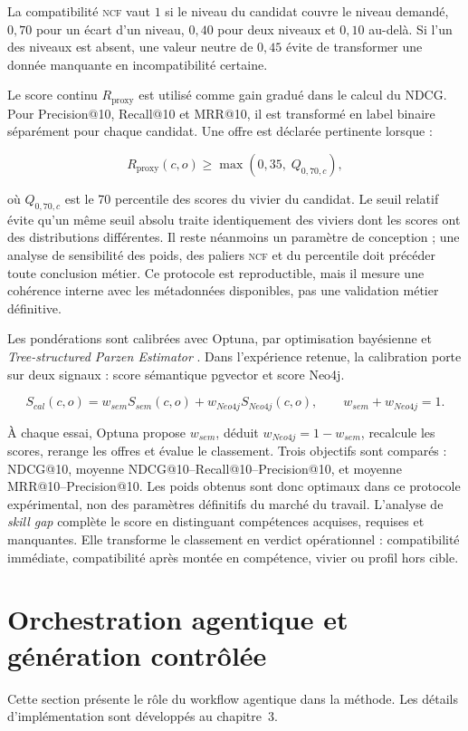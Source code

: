 \documentclass[12pt,twoside]{report}
\newcommand{\NCF}{\textsc{ncf}}
\begin{document}
La compatibilité \NCF{} vaut $1$ si le niveau du candidat couvre le niveau demandé, $0{,}70$ pour un écart d'un niveau, $0{,}40$ pour deux niveaux et $0{,}10$ au-delà. Si l'un des niveaux est absent, une valeur neutre de $0{,}45$ évite de transformer une donnée manquante en incompatibilité certaine.

Le score continu $R_{\mathrm{proxy}}$ est utilisé comme gain gradué dans le calcul du NDCG. Pour Precision@10, Recall@10 et MRR@10, il est transformé en label binaire séparément pour chaque candidat. Une offre est déclarée pertinente lorsque :

\[
R_{\mathrm{proxy}}(c,o)\geq
\max\!\left(0{,}35,\;Q_{0{,}70,c}\right),
\]

\noindent où $Q_{0{,}70,c}$ est le 70\ieme{} percentile des scores du vivier du candidat. Le seuil relatif évite qu'un même seuil absolu traite identiquement des viviers dont les scores ont des distributions différentes. Il reste néanmoins un paramètre de conception ; une analyse de sensibilité des poids, des paliers \NCF{} et du percentile doit précéder toute conclusion métier. Ce protocole est reproductible, mais il mesure une cohérence interne avec les métadonnées disponibles, pas une validation métier définitive.

Les pondérations sont calibrées avec Optuna, par optimisation bayésienne et \textit{Tree-structured Parzen Estimator} \cite{akiba2019optuna}. Dans l'expérience retenue, la calibration porte sur deux signaux : score sémantique pgvector et score Neo4j.

\[
S_{cal}(c,o)=w_{sem}S_{sem}(c,o)+w_{Neo4j}S_{Neo4j}(c,o),
\qquad w_{sem}+w_{Neo4j}=1.
\]

À chaque essai, Optuna propose $w_{sem}$, déduit $w_{Neo4j}=1-w_{sem}$, recalcule les scores, rerange les offres et évalue le classement. Trois objectifs sont comparés : NDCG@10, moyenne NDCG@10--Recall@10--Precision@10, et moyenne MRR@10--Precision@10. Les poids obtenus sont donc optimaux dans ce protocole expérimental, non des paramètres définitifs du marché du travail. L'analyse de \textit{skill gap} complète le score en distinguant compétences acquises, requises et manquantes. Elle transforme le classement en verdict opérationnel : compatibilité immédiate, compatibilité après montée en compétence, vivier ou profil hors cible.

\section{Orchestration agentique et génération contrôlée}
Cette section présente le rôle du workflow agentique dans la méthode. Les détails d'implémentation sont développés au chapitre~3.
\end{document}
